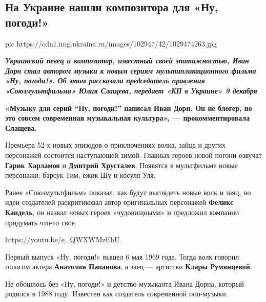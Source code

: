  
 
 
 
 
 
\subsection{На Украине нашли композитора для «Ну, погоди!»}
\label{sec:09_12_2020.news.ru.ukraina_ru.2.nu_pogodi_ukraina}


\ifcmt
pic https://cdn1.img.ukraina.ru/images/102947/42/1029474263.jpg
\fi

\begingroup
  \begin{center}
    \color{orange}\large\em\bfseries
Украинский певец и композитор, известный своей эпатажностью, Иван Дорн стал
автором музыки к новым сериям мультипликационного фильма «Ну, погоди!». Об этом
рассказала председатель правления «Союзмультфильма» Юлия Слащева, передает «КП
в Украине» 9 декабря
  \end{center}
\endgroup

\begin{leftbar}
        \bfseries
«Музыку для серий \enquote{Ну, погоди!} написал Иван Дорн. Он не блогер, но это совсем
современная музыкальная культура», — прокомментировала Слащева.
\end{leftbar}

Премьера 52-х новых эпизодов о приключениях волка, зайца и других персонажей
состоится наступающей зимой. Главных героев новой погони озвучат \textbf{Гарик Харламов}
и \textbf{Дмитрий Хрусталев}. Появятся в мультфильме новые персонажи: барсук Тим, ежик
Шу и косуля Уля.

Ранее «Союзмультфильм» показал, как будут выглядеть новые волк и заяц, но идеи
создателей раскритиковал автор оригинальных персонажей \textbf{Феликс Кандель}, он
назвал новых героев «чудовищными» и предложил компании придумать что-то свое.

\url{https://youtu.be/e_QWXWMzEhU}

Первый выпуск «Ну, погоди!» вышел 6 мая 1969 года. Тогда волк говорил голосом
актера \textbf{Анатолия Папанова}, а заец — артистки \textbf{Клары Румянцевой}.

Не обошлось без «Ну, погоди!» и детство музыканта Ивана Дорна, который родился
в 1988 году. Известен как создатель современной поп-музыки. 

